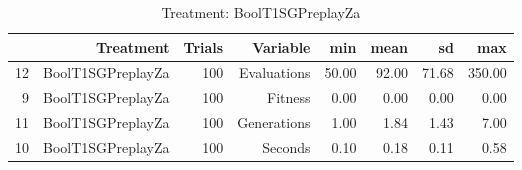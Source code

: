 \begin{table}[ht]
\centering
\begin{tabular}{rrrrrrrr}
  \hline
 & Treatment & Trials & Variable & min & mean & sd & max \\ 
  \hline
12 & BoolT1SGPreplayZa & 100 & Evaluations & 50.00 & 92.00 & 71.68 & 350.00 \\ 
  9 & BoolT1SGPreplayZa & 100 & Fitness & 0.00 & 0.00 & 0.00 & 0.00 \\ 
  11 & BoolT1SGPreplayZa & 100 & Generations & 1.00 & 1.84 & 1.43 & 7.00 \\ 
  10 & BoolT1SGPreplayZa & 100 & Seconds & 0.10 & 0.18 & 0.11 & 0.58 \\ 
   \hline
\end{tabular}
\caption{Treatment: BoolT1SGPreplayZa} 
\end{table}
